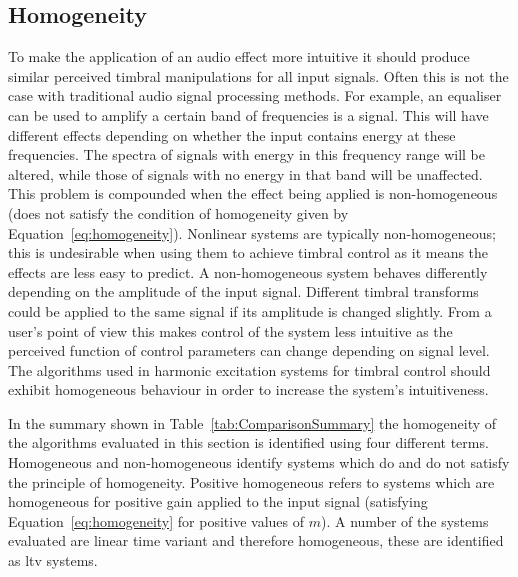 	\subsection{Homogeneity}
	\label{sec:ExcitationEvaluation-Evaluation-Homogeneity}
		To make the application of an audio effect more intuitive it should produce similar perceived timbral
		manipulations for all input signals. Often this is not the case with traditional audio signal processing
		methods. For example, an equaliser can be used to amplify a certain band of frequencies is a signal. This
		will have different effects depending on whether the input contains energy at these frequencies. The
		spectra of signals with energy in this frequency range will be altered, while those of signals with no
		energy in that band will be unaffected. This problem is compounded when the effect being applied is
		non-homogeneous (does not satisfy the condition of homogeneity given by Equation~\ref{eq:homogeneity}).
		Nonlinear systems are typically non-homogeneous; this is undesirable when using them to achieve timbral
		control as it means the effects are less easy to predict. A non-homogeneous system behaves differently
		depending on the amplitude of the input signal. Different timbral transforms could be applied to the same
		signal if its amplitude is changed slightly. From a user's point of view this makes control of the system
		less intuitive as the perceived function of control parameters can change depending on signal level. The
		algorithms used in harmonic excitation systems for timbral control should exhibit homogeneous behaviour in
		order to increase the system's intuitiveness.

		In the summary shown in Table~\ref{tab:ComparisonSummary} the homogeneity of the algorithms evaluated in
		this section is identified using four different terms. Homogeneous and non-homogeneous identify systems
		which do and do not satisfy the principle of homogeneity. Positive homogeneous refers to systems which are
		homogeneous for positive gain applied to the input signal (satisfying Equation~\ref{eq:homogeneity} for
		positive values of $m$). A number of the systems evaluated are linear time variant and therefore
		homogeneous, these are identified as \acrshort{ltv} systems.

